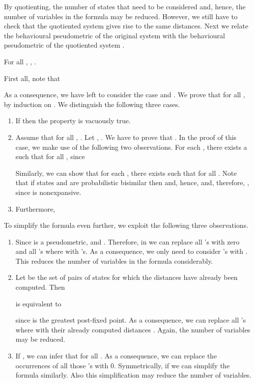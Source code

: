 \documentclass{LMCS}
\begin{document}
By quotienting, the number of states that need to be considered and, hence,
the number of variables in the formula may be reduced.  However, we still
have to check that the quotiented system gives rise to the same distances.
Next we relate the behavioural pseudometric  of the original system 
 with the behavioural pseudometric  of the 
quotiented system .

\begin{prop}
\label{proposition:B}
For all , , .
\end{prop}
\proof First all, note that

As a consequence, we have left to consider the case 
and .  We prove that for all ,
 by induction on .
We distinguish the following three cases.
\begin{enumerate}[]
\item
If  then the property is vacuously true.
\item
Assume that  for all , .
Let , .  We have to prove that .
In the proof of this case, we make use of the following two observations.  
For each , there exists a 
such that  for all , since
 
Similarly, we can show that for each , there exists
 such that  for all .
Note that if states  and  are probabilistic bisimilar then 
 and, hence,  and, therefore, ,
since  is nonexpansive.

\item
Furthermore,

\end{enumerate}

To simplify the formula even further, we exploit the following three observations.
\begin{enumerate}[]
\item
Since  is a pseudometric,  and 
.  Therefore,
in  we can replace
all 's with zero and all 's where  with
's.  As a consequence, we only need to consider 's with .
This reduces the number of variables in the formula considerably.
\item
Let  be the set of pairs of states for which the distances have already
been computed.  Then 

is equivalent to

since  is the greatest post-fixed point.  As a consequence, we can
replace all 's where  with their already computed
distances .  Again, the number of variables may be reduced.
\item
If , we can infer that  for all . 
As a consequence, we can replace the occurrences of all those 's 
with 0.  Symmetrically, if  we can simplify the formula
similarly.  Also this simplification may reduce the number of variables.
\end{enumerate}
\end{document}
